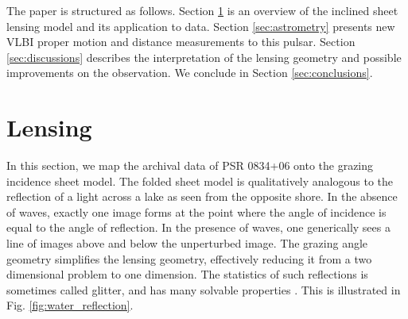 \documentclass[useAMS,usenatbib]{mn2e}
\begin{document}
The paper is structured as follows. Section \ref{sec:lensing}
is an overview of the inclined sheet lensing model and its application to data.
Section \ref{sec:astrometry} presents new VLBI proper motion and
distance measurements to this pulsar.
Section \ref{sec:discussions} describes the interpretation of the
lensing geometry and possible improvements on the observation.   
We conclude in Section \ref{sec:conclusions}.




\section{Lensing}
\label{sec:lensing}
In this section, we map the archival data of PSR 0834+06 onto the grazing incidence sheet
model.  The folded sheet model is qualitatively analogous to the
reflection of a light across a lake as seen from the opposite
shore.
In the absence of waves, exactly one image forms at the point
where the angle of incidence is equal to the angle of reflection.  In
the presence of waves, one generically sees a line of images above and
below the unperturbed image.  The grazing angle geometry simplifies
the lensing geometry, effectively reducing it from a two dimensional problem to
one dimension.  The statistics of such reflections is sometimes called
glitter, and has many solvable
properties \citep{LonguetHiggins1960}.  This is illustrated in
Fig. \ref{fig:water_reflection}.


\end{document}
